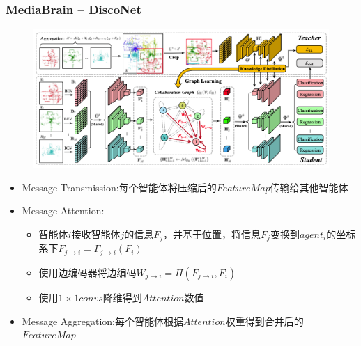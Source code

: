 \documentclass[8]{beamer}
\begin{document}
\begin{frame}
    \frametitle{MediaBrain -- DiscoNet\cite{li2021learning}}
    \begin{figure}
        \includegraphics[width=0.6\linewidth]{pic/DiscoNet.png}
    \end{figure}
        \begin{itemize}
        \footnotesize
        \item Message Transmission:每个智能体将压缩后的$Feature Map$传输给其他智能体
        \item Message Attention:
        \begin{itemize}
            \footnotesize
            \item 智能体$i$接收智能体$j$的信息$F_j$，并基于位置，将信息$F_j$变换到$agent_i$的坐标系下$F_{j\rightarrow i}=\Gamma_{j\rightarrow i}(F_i) $
            \item 使用边编码器将边编码$W_{j\rightarrow i} = \Pi (F_{j \rightarrow i}, F_i)$
            \item 使用$1\times 1 convs$降维得到$Attention$数值
        \end{itemize}
        \item Message Aggregation:每个智能体根据$Attention$权重得到合并后的$Feature Map$  
     \end{itemize}
\end{frame}
\end{document}
